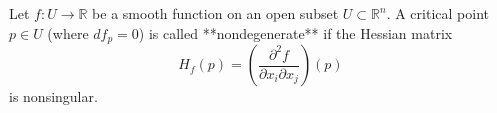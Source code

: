 Let $f: U \to \mathbb{R}$ be a smooth function on an open subset $U \subset \mathbb{R}^n$. A critical point $p \in U$ (where $df_p = 0$) is called **nondegenerate** if the Hessian matrix
$$H_f(p) = \left(\frac{\partial^2 f}{\partial x_i \partial x_j}\right)(p)$$
is nonsingular.
